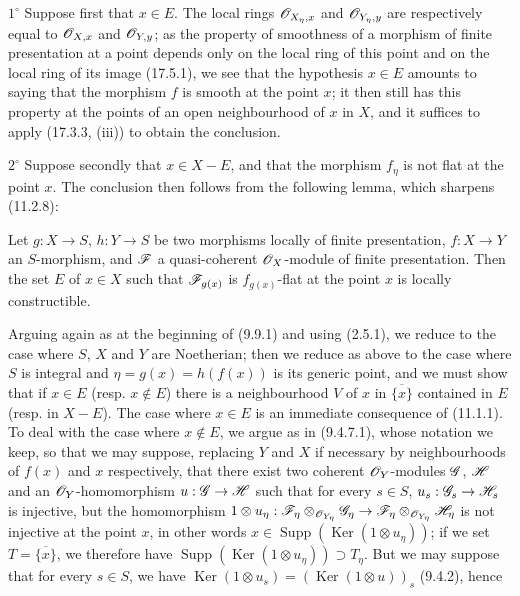 $1^\circ$ Suppose first that $x\in E$. The local rings $\mathscr{O}_{X_\eta,x}$ and $\mathscr{O}_{Y_\eta,y}$ are respectively equal to $\mathscr{O}_{X,x}$ and $\mathscr{O}_{Y,y}$; as the property of smoothness of a morphism of finite presentation at a point depends only on the local ring of this point and on the local ring of its image (17.5.1), we see that the hypothesis $x\in E$ amounts to saying that the morphism $f$ is smooth at the point $x$; it then still has this property at the points of an open neighbourhood of $x$ in $X$, and it suffices to apply (17.3.3, (iii)) to obtain the conclusion.

$2^\circ$ Suppose secondly that $x\in X-E$, and that the morphism $f_\eta$ is not flat at the point $x$. The conclusion then follows from the following lemma, which sharpens (11.2.8):

\begin{lemma}[17.7.11.1]
\label{IV.17.7.11.1}
Let $g:X\to S$, $h:Y\to S$ be two morphisms locally of finite presentation, $f:X\to Y$ an $S$-morphism, and $\mathscr{F}$ a quasi-coherent $\mathscr{O}_X$-module of finite presentation. Then the set $E$ of $x\in X$ such that $\mathscr{F}_{g(x)}$ is $f_{g(x)}$-flat at the point $x$ is locally constructible.
\end{lemma}

Arguing again as at the beginning of (9.9.1) and using (2.5.1), we reduce to the case where $S$, $X$ and $Y$ are Noetherian; then we reduce as above to the case where $S$ is integral and $\eta=g(x)=h(f(x))$ is its generic point, and we must show that if $x\in E$ (resp. $x\notin E$) there is a neighbourhood $V$ of $x$ in $\overline{\{x\}}$ contained in $E$ (resp. in $X-E$). The case where $x\in E$ is an immediate consequence of (11.1.1). To deal with the case where $x\notin E$, we argue as in (9.4.7.1), whose notation we keep, so that we may suppose, replacing $Y$ and $X$ if necessary by neighbourhoods of $f(x)$ and $x$ respectively, that there exist two coherent $\mathscr{O}_Y$-modules $\mathscr{G}$, $\mathscr{H}$ and an $\mathscr{O}_Y$-homomorphism $u:\mathscr{G}\to\mathscr{H}$ such that for every $s\in S$, $u_s:\mathscr{G}_s\to\mathscr{H}_s$ is injective, but the homomorphism $1\otimes u_\eta:\mathscr{F}_\eta\otimes_{\mathscr{O}_{Y_\eta}}\mathscr{G}_\eta\to\mathscr{F}_\eta\otimes_{\mathscr{O}_{Y_\eta}}\mathscr{H}_\eta$ is not injective at the point $x$, in other words $x\in\operatorname{Supp}(\operatorname{Ker}(1\otimes u_\eta))$; if we set $T=\overline{\{x\}}$, we therefore have $\operatorname{Supp}(\operatorname{Ker}(1\otimes u_\eta))\supset T_\eta$. But we may suppose that for every $s\in S$, we have $\operatorname{Ker}(1\otimes u_s)=(\operatorname{Ker}(1\otimes u))_s$ (9.4.2), hence

